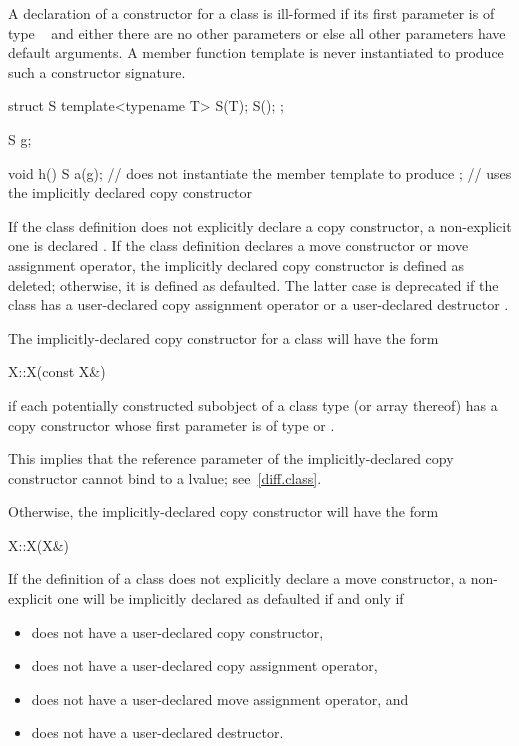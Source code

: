 \pnum
A declaration of a constructor for a class
is ill-formed if its first parameter is of type
\cv{}~
and either there are no other parameters or else all other parameters have
default arguments.
A member function template is never instantiated to
produce such a constructor signature.
\begin{example}
\begin{codeblock}
struct S {
  template<typename T> S(T);
  S();
};

S g;

void h() {
  S a(g);           // does not instantiate the member template to produce ;
                    // uses the implicitly declared copy constructor
}
\end{codeblock}
\end{example}

\pnum
If the class definition does not explicitly declare a copy constructor,
a non-explicit one is declared .
If the class definition declares a move
constructor or move assignment operator, the implicitly declared copy
constructor is defined as deleted; otherwise, it is defined as
defaulted.
The latter case is deprecated if the class has a user-declared copy assignment
operator or a user-declared destructor .

\pnum
The implicitly-declared copy constructor for a class
will have the form
\begin{codeblock}
X::X(const X&)
\end{codeblock}
if each potentially constructed subobject of a class type
(or array thereof)
has a copy constructor whose first parameter is of type
or
.
\begin{footnote}
This implies that the reference parameter of the
implicitly-declared copy constructor
cannot bind to a
lvalue; see~\ref{diff.class}.
\end{footnote}
Otherwise, the implicitly-declared copy constructor will have the form
\begin{codeblock}
X::X(X&)
\end{codeblock}

\pnum
{}%
If the definition of a class  does not explicitly declare
a move constructor, a non-explicit one will be
implicitly declared as defaulted if and only if
\begin{itemize}
\item
{} does not have a user-declared copy constructor,

\item
{} does not have a user-declared copy assignment operator,

\item
{} does not have a user-declared move assignment operator, and

\item
{} does not have a user-declared destructor.
\end{itemize}

